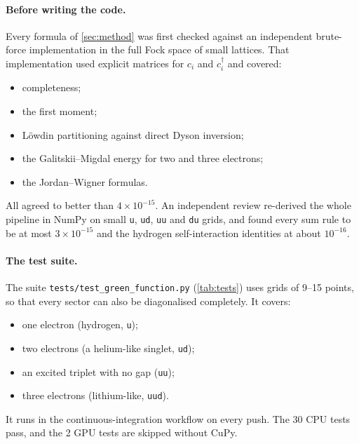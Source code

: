 \documentclass[11pt,a4paper]{article}
\newcommand{\code}[1]{\texttt{#1}}
\begin{document}
\paragraph{Before writing the code.} Every formula of \cref{sec:method} was first checked against an independent brute-force implementation in the full Fock space of small lattices. That implementation used explicit matrices for $c_i$ and $c_i^\dagger$ and covered:
\begin{itemize}
\item completeness;
\item the first moment;
\item Löwdin partitioning against direct Dyson inversion;
\item the Galitskii--Migdal energy for two and three electrons;
\item the Jordan--Wigner formulas.
\end{itemize}
All agreed to better than $4\times10^{-15}$. An independent review re-derived the whole pipeline in NumPy on small \code{u}, \code{ud}, \code{uu} and \code{du} grids, and found every sum rule to be at most $3\times10^{-15}$ and the hydrogen self-interaction identities at about $10^{-16}$.

\paragraph{The test suite.} The suite \code{tests/test\_green\_function.py} (\cref{tab:tests}) uses grids of 9--15 points, so that every sector can also be diagonalised completely. It covers:
\begin{itemize}
\item one electron (hydrogen, \code{u});
\item two electrons (a helium-like singlet, \code{ud});
\item an excited triplet with no gap (\code{uu});
\item three electrons (lithium-like, \code{uud}).
\end{itemize}
It runs in the continuous-integration workflow on every push. The 30 CPU tests pass, and the 2 GPU tests are skipped without CuPy.
\end{document}

